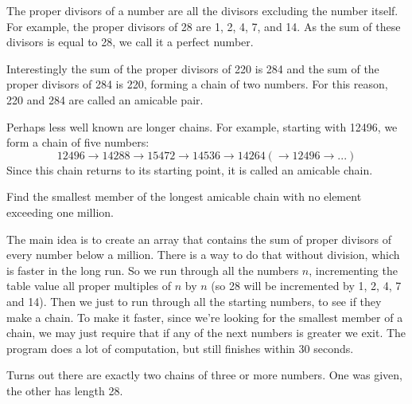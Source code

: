 



The proper divisors of a number are all the divisors excluding the number itself. For example, the proper divisors of 28 are 1, 2, 4, 7, and 14. As the sum of these divisors is equal to 28, we call it a perfect number.

Interestingly the sum of the proper divisors of 220 is 284 and the sum of the proper divisors of 284 is 220, forming a chain of two numbers. For this reason, 220 and 284 are called an amicable pair.

Perhaps less well known are longer chains. For example, starting with 12496, we form a chain of five numbers:
$$ 12496 \to 14288 \to 15472 \to 14536 \to 14264 (\to 12496 \to ...) $$
Since this chain returns to its starting point, it is called an amicable chain.

Find the smallest member of the longest amicable chain with no element exceeding one million.

The main idea is to create an array that contains the sum of proper divisors of every number below a million.  There is a way to do that without division, which is faster in the long run.  So we run through all the numbers $n$, incrementing the table value  all proper multiples of $n$ by $n$ (so 28 will be incremented by 1, 2, 4, 7 and 14).  Then we just to run through all
the starting numbers, to see if they make a chain.  To make it faster, since we're looking for the smallest member of a chain, we may just require that if any of the next numbers is greater we exit.  The program does a lot of computation, but still finishes within 30 seconds.

\footnotesize
Turns out there are exactly two chains of three or more numbers.  One was given, the other has length 28.
\normalsize
{}



